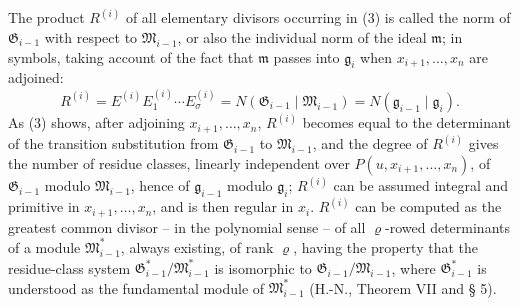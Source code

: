 \documentclass[11pt]{article}
\providecommand{\frakM}{\mathfrak M}
\providecommand{\frakG}{\mathfrak G}
\providecommand{\frakm}{\mathfrak m}
\providecommand{\frakg}{\mathfrak g}
\providecommand{\frakM}{\mathfrak M}
\providecommand{\frakG}{\mathfrak G}
\providecommand{\frakG}{\mathfrak G}
\begin{document}
The product $R^{(i)}$ of all elementary divisors occurring in (3) is called the norm of $\frakG_{i-1}$ with respect to $\frakM_{i-1}$, or also the individual norm of the ideal $\frakm$; in symbols, taking account of the fact that $\frakm$ passes into $\frakg_i$ when $x_{i+1},\ldots,x_n$ are adjoined:
\begin{equation}
 R^{(i)}=E^{(i)}E_1^{(i)}\cdots E_\sigma^{(i)}
 =N(\frakG_{i-1}\mid\frakM_{i-1})=N(\frakg_{i-1}\mid\frakg_i).
\end{equation}
As (3) shows, after adjoining $x_{i+1},\ldots,x_n$, $R^{(i)}$ becomes equal to the determinant of the transition substitution from $\frakG_{i-1}$ to $\frakM_{i-1}$, and the degree of $R^{(i)}$ gives the number of residue classes, linearly independent over $P(u,x_{i+1},\ldots,x_n)$, of $\frakG_{i-1}$ modulo $\frakM_{i-1}$, hence of $\frakg_{i-1}$ modulo $\frakg_i$; $R^{(i)}$ can be assumed integral and primitive in $x_{i+1},\ldots,x_n$, and is then regular in $x_i$. $R^{(i)}$ can be computed as the greatest common divisor -- in the polynomial sense -- of all $\varrho$-rowed determinants of a module $\frakM^*_{i-1}$, always existing, of rank $\varrho$, having the property that the residue-class system $\frakG^*_{i-1}/\frakM^*_{i-1}$ is isomorphic to $\frakG_{i-1}/\frakM_{i-1}$, where $\frakG^*_{i-1}$ is understood as the fundamental module of $\frakM^*_{i-1}$ (H.-N., Theorem VII and § 5).
\end{document}
